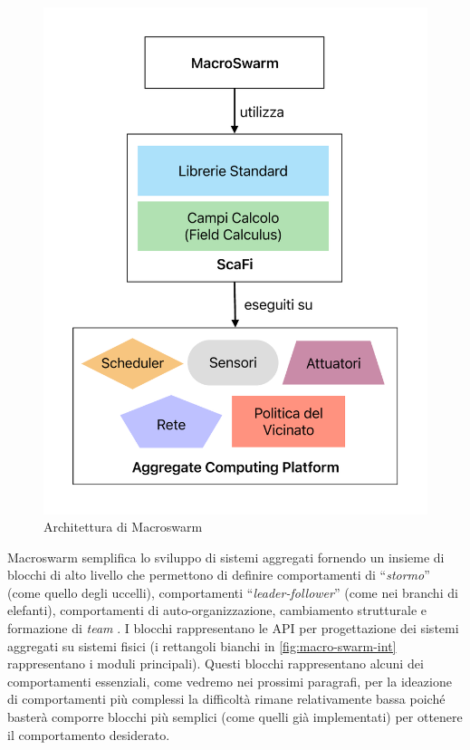 \documentclass[12pt,a4paper,openright,twoside]{book}
\begin{document}
\begin{figure}
    \centering
    \includegraphics[width=.8\linewidth]{figures/macroSwarm-arc.pdf}
    \caption{Architettura di Macroswarm}
    \label{fig:macro-swarm-arc}
\end{figure}

Macroswarm semplifica lo sviluppo di sistemi aggregati fornendo un insieme di blocchi di alto livello che permettono di definire comportamenti di ``\textit{stormo}'' (come quello degli uccelli), comportamenti ``\textit{leader-follower}'' (come nei branchi di elefanti), comportamenti di auto-organizzazione, cambiamento strutturale e formazione di \textit{team} \cite{Macroswarm}.
I blocchi rappresentano le API per progettazione dei sistemi aggregati su sistemi fisici (i rettangoli bianchi in \cref{fig:macro-swarm-int} rappresentano i moduli principali). Questi blocchi rappresentano alcuni dei comportamenti essenziali, come vedremo nei prossimi paragrafi, per la ideazione di comportamenti più complessi la difficoltà rimane relativamente bassa poiché basterà comporre blocchi più semplici (come quelli già implementati) per ottenere il comportamento desiderato.
\end{document}
